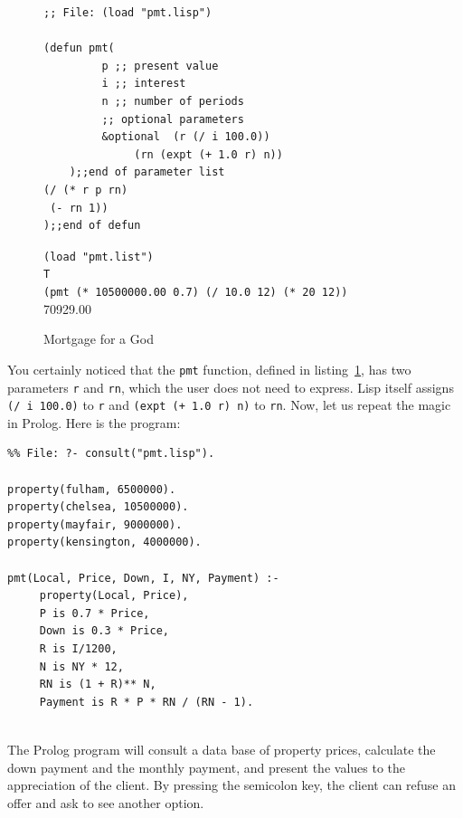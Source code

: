 \documentclass[a4paper,12pt]{book}
\newenvironment{fmpage}[1]
           {\begin{lrbox}{\fmbox}\begin{minipage}{#1}}
           {\end{minipage}\end{lrbox}\fbox{\usebox{\fmbox}}}
\begin{document}
\begin{figure}[!h]
\begin{fmpage}{0.9\textwidth}
\begin{verbatim}
;; File: (load "pmt.lisp")

(defun pmt( 
         p ;; present value
         i ;; interest 
         n ;; number of periods
         ;; optional parameters
         &optional  (r (/ i 100.0)) 
              (rn (expt (+ 1.0 r) n)) 
    );;end of parameter list
(/ (* r p rn)
 (- rn 1))
);;end of defun
\end{verbatim}
\end{fmpage}

\begin{fmpage}{0.9\textwidth}
\verb|(load "pmt.list")|\\
\verb|T|\\
\verb|(pmt (* 10500000.00 0.7) (/ 10.0 12) (* 20 12))|\\
70929.00
\end{fmpage}
\caption{Mortgage for a God}
\label{Pan:mortgage}
\end{figure}

You certainly noticed that the
\verb|pmt| function, defined
in listing~\ref{Pan:mortgage},
has two parameters \verb|r| and \verb|rn|,
which the user does not need
to express. Lisp itself
assigns \verb|(/ i 100.0)| to \verb|r|
and \verb|(expt (+ 1.0 r) n)| to \verb|rn|.
Now, let us repeat the magic in Prolog. Here is
the program:\\


\begin{fmpage}{0.9\textwidth}
\begin{verbatim}
%% File: ?- consult("pmt.lisp").

property(fulham, 6500000).
property(chelsea, 10500000).
property(mayfair, 9000000).
property(kensington, 4000000).

pmt(Local, Price, Down, I, NY, Payment) :-
     property(Local, Price),
     P is 0.7 * Price,
     Down is 0.3 * Price,
     R is I/1200,
     N is NY * 12,
     RN is (1 + R)** N,
     Payment is R * P * RN / (RN - 1).

\end{verbatim}
\end{fmpage}

\verb||\\
The Prolog program will consult a data base of
property prices, calculate the down payment and
the monthly payment, and present the values to
the appreciation of the client. By pressing the
semicolon key, the client can refuse an offer and
ask to see another option.
\end{document}
